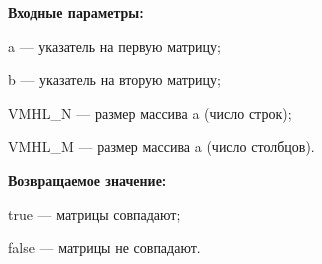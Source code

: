 \textbf{Входные параметры:}

a --- указатель на первую матрицу;
 
b --- указатель на вторую матрицу;
 
VMHL\_N --- размер массива a (число строк);
 
VMHL\_M --- размер массива a (число столбцов).

\textbf{Возвращаемое значение:}
 
 true --- матрицы совпадают;
 
false --- матрицы не совпадают.